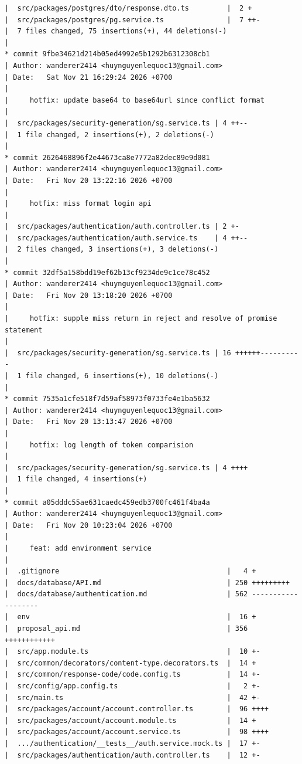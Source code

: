 \documentclass[12pt]{article}
\begin{document}
\begin{lstlisting}[numbers=none,breaklines=true]
|  src/packages/postgres/dto/response.dto.ts         |  2 +
|  src/packages/postgres/pg.service.ts               |  7 ++-
|  7 files changed, 75 insertions(+), 44 deletions(-)
|
* commit 9fbe34621d214b05ed4992e5b1292b6312308cb1
| Author: wanderer2414 <huynguyenlequoc13@gmail.com>
| Date:   Sat Nov 21 16:29:24 2026 +0700
|
|     hotfix: update base64 to base64url since conflict format
|
|  src/packages/security-generation/sg.service.ts | 4 ++--
|  1 file changed, 2 insertions(+), 2 deletions(-)
|
* commit 2626468896f2e44673ca8e7772a82dec89e9d081
| Author: wanderer2414 <huynguyenlequoc13@gmail.com>
| Date:   Fri Nov 20 13:22:16 2026 +0700
|
|     hotfix: miss format login api
|
|  src/packages/authentication/auth.controller.ts | 2 +-
|  src/packages/authentication/auth.service.ts    | 4 ++--
|  2 files changed, 3 insertions(+), 3 deletions(-)
|
* commit 32df5a158bdd19ef62b13cf9234de9c1ce78c452
| Author: wanderer2414 <huynguyenlequoc13@gmail.com>
| Date:   Fri Nov 20 13:18:20 2026 +0700
|
|     hotfix: supple miss return in reject and resolve of promise statement
|
|  src/packages/security-generation/sg.service.ts | 16 ++++++----------
|  1 file changed, 6 insertions(+), 10 deletions(-)
|
* commit 7535a1cfe518f7d59af58973f0733fe4e1ba5632
| Author: wanderer2414 <huynguyenlequoc13@gmail.com>
| Date:   Fri Nov 20 13:13:47 2026 +0700
|
|     hotfix: log length of token comparision
|
|  src/packages/security-generation/sg.service.ts | 4 ++++
|  1 file changed, 4 insertions(+)
|
* commit a05dddc55ae631caedc459edb3700fc461f4ba4a
| Author: wanderer2414 <huynguyenlequoc13@gmail.com>
| Date:   Fri Nov 20 10:23:04 2026 +0700
|
|     feat: add environment service
|
|  .gitignore                                        |   4 +
|  docs/database/API.md                              | 250 +++++++++
|  docs/database/authentication.md                   | 562 -------------------
|  env                                               |  16 +
|  proposal_api.md                                   | 356 ++++++++++++
|  src/app.module.ts                                 |  10 +-
|  src/common/decorators/content-type.decorators.ts  |  14 +
|  src/common/response-code/code.config.ts           |  14 +-
|  src/config/app.config.ts                          |   2 +-
|  src/main.ts                                       |  42 +-
|  src/packages/account/account.controller.ts        |  96 ++++
|  src/packages/account/account.module.ts            |  14 +
|  src/packages/account/account.service.ts           |  98 ++++
|  .../authentication/__tests__/auth.service.mock.ts |  17 +-
|  src/packages/authentication/auth.controller.ts    |  12 +-

\end{lstlisting}
\end{document}
